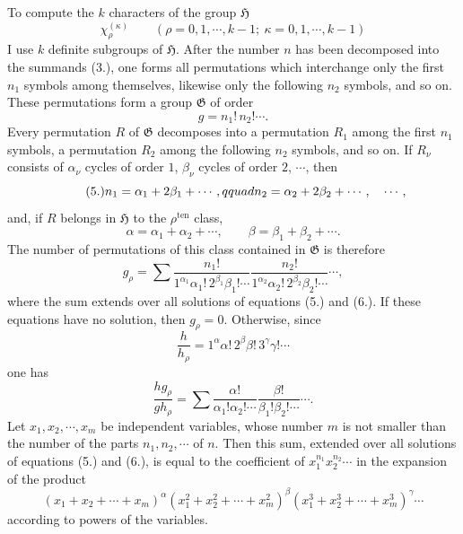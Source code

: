 \documentclass[11pt]{article}
\newcommand{\Hgr}{\mathfrak{H}}
\newcommand{\Ggr}{\mathfrak{G}}
\newcommand{\ten}{\mathrm{ten}}
\begin{document}
To compute the $k$ characters of the group $\Hgr$
\[
 \chi_\rho^{(\kappa)}\qquad(\rho=0,1,\cdots,k-1;\ \kappa=0,1,\cdots,k-1)
\]
I use $k$ definite subgroups of $\Hgr$. After the number $n$ has been decomposed into the summands (3.), one forms all permutations which interchange only the first $n_1$ symbols among themselves, likewise only the following $n_2$ symbols, and so on. These permutations form a group $\Ggr$ of order
\begin{equation}\tag{4.}
 g=n_1!\,n_2!\cdots.
\end{equation}
Every permutation $R$ of $\Ggr$ decomposes into a permutation $R_1$ among the first $n_1$ symbols, a permutation $R_2$ among the following $n_2$ symbols, and so on. If $R_\nu$ consists of $\alpha_\nu$ cycles of order $1$, $\beta_\nu$ cycles of order $2$, $\cdots$, then
\begin{equation}\tag{5.}
 n_1=\alpha_1+2\beta_1+\cdots,\\qquad n_2=\alpha_2+2\beta_2+\cdots,\quad\cdots,
\end{equation}
and, if $R$ belongs in $\Hgr$ to the $\rho^{\ten}$ class,
\begin{equation}\tag{6.}
 \alpha=\alpha_1+\alpha_2+\cdots,\qquad \beta=\beta_1+\beta_2+\cdots.
\end{equation}
The number of permutations of this class contained in $\Ggr$ is therefore
\[
 g_\rho=\sum \frac{n_1!}{1^{\alpha_1}\alpha_1!\,2^{\beta_1}\beta_1!\cdots}
           \frac{n_2!}{1^{\alpha_2}\alpha_2!\,2^{\beta_2}\beta_2!\cdots}\cdots,
\]
where the sum extends over all solutions of equations (5.) and (6.). If these equations have no solution, then $g_\rho=0$. Otherwise, since
\begin{equation}\tag{7.}
 \frac{h}{h_\rho}=1^\alpha\alpha!\,2^\beta\beta!\,3^\gamma\gamma!\cdots
\end{equation}
one has
\[
 \frac{h g_\rho}{g h_\rho}=\sum
 \frac{\alpha!}{\alpha_1!\alpha_2!\cdots}
 \frac{\beta!}{\beta_1!\beta_2!\cdots}\cdots.
\]
Let $x_1,x_2,\cdots,x_m$ be independent variables, whose number $m$ is not smaller than the number of the parts $n_1,n_2,\cdots$ of $n$. Then this sum, extended over all solutions of equations (5.) and (6.), is equal to the coefficient of $x_1^{n_1}x_2^{n_2}\cdots$ in the expansion of the product
\begin{equation}\tag{8.}
 (x_1+x_2+\cdots+x_m)^\alpha
 (x_1^2+x_2^2+\cdots+x_m^2)^\beta
 (x_1^3+x_2^3+\cdots+x_m^3)^\gamma\cdots
\end{equation}
according to powers of the variables.
\end{document}
